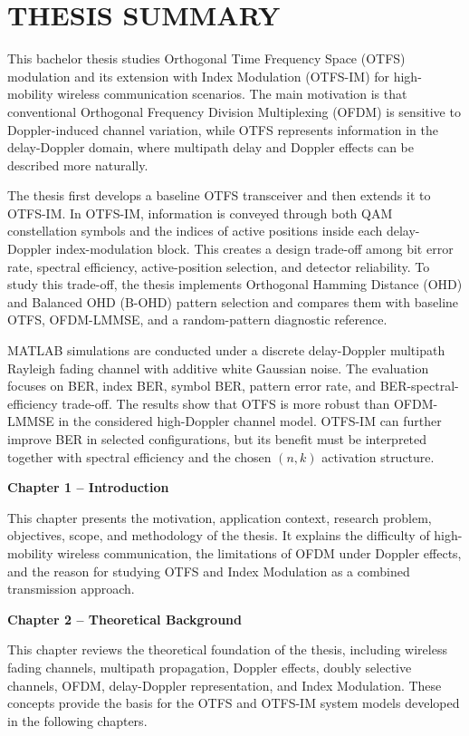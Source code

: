 \section*{THESIS SUMMARY}
\thispagestyle{plain}

This bachelor thesis studies Orthogonal Time Frequency Space (OTFS) modulation and its extension with Index Modulation (OTFS-IM) for high-mobility wireless communication scenarios. The main motivation is that conventional Orthogonal Frequency Division Multiplexing (OFDM) is sensitive to Doppler-induced channel variation, while OTFS represents information in the delay-Doppler domain, where multipath delay and Doppler effects can be described more naturally.

The thesis first develops a baseline OTFS transceiver and then extends it to OTFS-IM. In OTFS-IM, information is conveyed through both QAM constellation symbols and the indices of active positions inside each delay-Doppler index-modulation block. This creates a design trade-off among bit error rate, spectral efficiency, active-position selection, and detector reliability. To study this trade-off, the thesis implements Orthogonal Hamming Distance (OHD) and Balanced OHD (B-OHD) pattern selection and compares them with baseline OTFS, OFDM-LMMSE, and a random-pattern diagnostic reference.

MATLAB simulations are conducted under a discrete delay-Doppler multipath Rayleigh fading channel with additive white Gaussian noise. The evaluation focuses on BER, index BER, symbol BER, pattern error rate, and BER-spectral-efficiency trade-off. The results show that OTFS is more robust than OFDM-LMMSE in the considered high-Doppler channel model. OTFS-IM can further improve BER in selected configurations, but its benefit must be interpreted together with spectral efficiency and the chosen \((n,k)\) activation structure.

\textbf{Chapter 1 -- Introduction}

This chapter presents the motivation, application context, research problem, objectives, scope, and methodology of the thesis. It explains the difficulty of high-mobility wireless communication, the limitations of OFDM under Doppler effects, and the reason for studying OTFS and Index Modulation as a combined transmission approach.

\textbf{Chapter 2 -- Theoretical Background}

This chapter reviews the theoretical foundation of the thesis, including wireless fading channels, multipath propagation, Doppler effects, doubly selective channels, OFDM, delay-Doppler representation, and Index Modulation. These concepts provide the basis for the OTFS and OTFS-IM system models developed in the following chapters.

